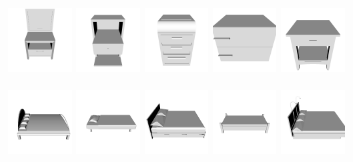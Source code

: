 \begin{figure}[!t]
	\includegraphics[width=0.15\textwidth]{Figures/ObjRecog/nstand_0}\hfill
	\includegraphics[width=0.15\textwidth]{Figures/ObjRecog/nstand_1}\hfill
	\includegraphics[width=0.15\textwidth]{Figures/ObjRecog/nstand_2}\hfill
	\includegraphics[width=0.15\textwidth]{Figures/ObjRecog/nstand_3}\hfill
	\includegraphics[width=0.15\textwidth]{Figures/ObjRecog/nstand_4}\hfill

	\includegraphics[width=0.15\textwidth]{Figures/ObjRecog/bed_0}\hfill
	\includegraphics[width=0.15\textwidth]{Figures/ObjRecog/bed_1}\hfill
	\includegraphics[width=0.15\textwidth]{Figures/ObjRecog/bed_2}\hfill
	\includegraphics[width=0.15\textwidth]{Figures/ObjRecog/bed_3}\hfill
	\includegraphics[width=0.15\textwidth]{Figures/ObjRecog/bed_4}\hfill


\end{figure}
